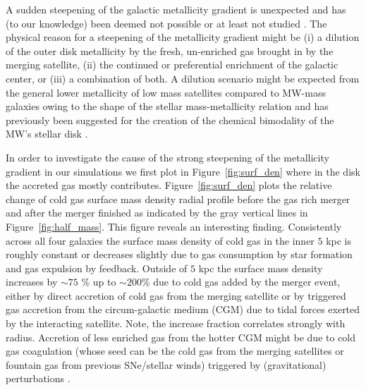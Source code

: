 \documentclass[useAMS,usenatbib]{mnras}
\begin{document}
A sudden steepening of the galactic metallicity gradient is unexpected and has (to our knowledge) been deemed not possible or at least not studied \citep[e.g.][for an extensive study]{Chiappini2001}. The physical reason for a steepening of the metallicity gradient might be (i) a dilution of the outer disk metallicity by the fresh, un-enriched gas brought in by the merging satellite, (ii) the continued or preferential enrichment of the galactic center, or (iii) a combination of both. A dilution scenario might be expected from the general lower metallicity of low mass satellites compared to MW-mass galaxies owing to the shape of the stellar mass-metallicity relation and has previously been suggested for the creation of the chemical bimodality of the MW's stellar disk \citep[e.g.][]{Chiappini1997, Spitoni2019, Buck2020}.

In order to investigate the cause of the strong steepening of the metallicity gradient in our simulations we first plot in Figure~\ref{fig:surf_den} where in the disk the accreted gas mostly contributes. Figure~\ref{fig:surf_den} plots the relative change of cold gas surface mass density radial profile before the gas rich merger and after the merger finished as indicated by the gray vertical lines in Figure~\ref{fig:half_mass}. This figure reveals an interesting finding. Consistently across all four galaxies the surface mass density of cold gas in the inner $5$ kpc is roughly constant or decreases slightly due to gas consumption by star formation and gas expulsion by feedback. Outside of $5$ kpc the surface mass density increases by $\sim75$ \% up to $\sim200$\% due to cold gas added by the merger event, either by direct accretion of cold gas from the merging satellite or by triggered gas accretion from the circum-galactic medium (CGM) due to tidal forces exerted by the interacting satellite. Note, the increase fraction correlates strongly with radius. Accretion of less enriched gas from the hotter CGM might be due to cold gas coagulation (whose seed can be the cold gas from the merging satellites or fountain gas \citep[e.g.][]{Armillotta2016,Sparre2020} from previous SNe/stellar winds) triggered by (gravitational) perturbations \citep[e.g.][]{Gronke2022}.
\end{document}
